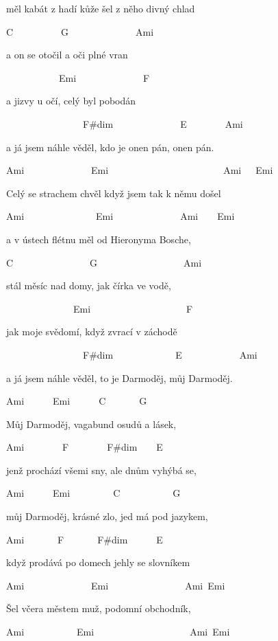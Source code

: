 měl kabát z hadí kůže šel z něho divný chlad

C~~~~~~~~~~G~~~~~~~~~~~~~~Ami

a on se otočil a oči plné vran

~~~~~~~~~~~Emi~~~~~~~~~~~~~~F~~

a jizvy u očí, celý byl pobodán

~~~~~~~~~~~~~~~~F\#dim~~~~~~~~~~~~~~E\7~~~~~~~~Ami

a já jsem náhle věděl, kdo je onen pán, onen pán.

\bigskip

Ami~~~~~~~~~~~~~~Emi~~~~~~~~~~~~~~~~~~~~~~~~Ami~~~Emi

Celý se strachem chvěl když jsem tak k němu došel

Ami~~~~~~~~~~~~~~~Emi~~~~~~~~~~~~~~Ami~~~~Emi

a v ústech flétnu měl od Hieronyma Bosche,

C~~~~~~~~~~~~~~~~G~~~~~~~~~~~~~~~~~~Ami

stál měsíc nad domy, jak čírka ve vodě,

~~~~~~~~~~~~~~Emi~~~~~~~~~~~~~~~~~~~~F~

jak moje svědomí, když zvrací v záchodě

~~~~~~~~~~~~~~~~F\#dim~~~~~~~~~~~~~E\7~~~~~~~~~~~~Ami

a já jsem náhle věděl, to je Darmoděj, můj Darmoděj.

\bigskip

\begin{chorustext}
Ami~~~~~~Emi~~~~~~C~~~~~~~G~~~~~~~~~~

Můj Darmoděj, vagabund osudů a lásek,

Ami~~~~~~~~F~~~~~~~~F\#dim~~~~E\7~~~~~~~~~~~

jenž prochází všemi sny, ale dnům vyhýbá se,

Ami~~~~~~Emi~~~~~~~~~C~~~~~~~~~~~G~~~~~~~~~~~

můj Darmoděj, krásné zlo, jed má pod jazykem,

Ami~~~~~~~F~~~~~~~F\#dim~~~~~~E\7~~~~~~~~

když prodává po domech jehly se slovníkem
\end{chorustext}

\bigskip

Ami~~~~~~~~~~~~~~Emi~~~~~~~~~~~~~~~~Ami~Emi

Šel včera městem muž, podomní obchodník,

Ami~~~~~~~~~~~Emi~~~~~~~~~~~~~~~~~~~~Ami~Emi

